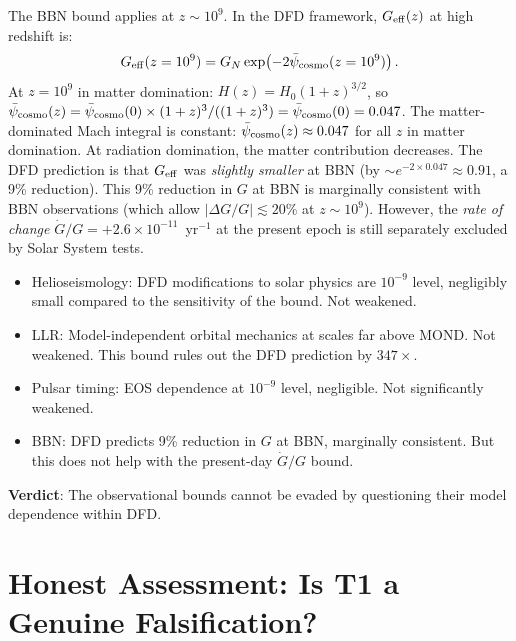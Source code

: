 \documentclass[11pt]{article}
\newcommand{\ee}[1]{\times 10^{#1}}
\newcommand{\psicosmo}{\bar{\psi}_{\rm cosmo}}
\begin{document}
The BBN bound applies at $z \sim 10^9$. In the DFD framework, $G_{\rm eff}(z)$
at high redshift is:
\begin{equation}
G_{\rm eff}(z = 10^9) = G_N\exp\!\left(-2\psicosmo(z=10^9)\right).
\end{equation}
At $z = 10^9$ in matter domination: $H(z) = H_0(1+z)^{3/2}$, so
$\psicosmo(z) = \psicosmo(0)\times(1+z)^3/((1+z)^3) = \psicosmo(0) = 0.047$.
The matter-dominated Mach integral is constant: $\psicosmo(z) \approx 0.047$
for all $z$ in matter domination. At radiation domination, the matter
contribution decreases. The DFD prediction is that $G_{\rm eff}$ was
\emph{slightly smaller} at BBN (by $\sim e^{-2\times 0.047} \approx 0.91$,
a 9\% reduction). This 9\% reduction in $G$ at BBN is marginally consistent
with BBN observations (which allow $|\Delta G/G| \lesssim 20\%$ at $z \sim 10^9$).
However, the \emph{rate of change} $\dot{G}/G = +2.6\ee{-11}$~yr$^{-1}$ at
the present epoch is still separately excluded by Solar System tests.

\begin{tcolorbox}[colback=orange!5!white, colframe=orange!60!black,
  title=\textbf{Resolution 3 Assessment: Bounds Are Not Significantly Model-Dependent}]
\begin{itemize}[nosep]
\item Helioseismology: DFD modifications to solar physics are $10^{-9}$
  level, negligibly small compared to the sensitivity of the bound. Not weakened.
\item LLR: Model-independent orbital mechanics at scales far above MOND.
  Not weakened. This bound rules out the DFD prediction by $347\times$.
\item Pulsar timing: EOS dependence at $10^{-9}$ level, negligible.
  Not significantly weakened.
\item BBN: DFD predicts 9\% reduction in $G$ at BBN, marginally consistent.
  But this does not help with the present-day $\dot{G}/G$ bound.
\end{itemize}
\textbf{Verdict}: The observational bounds cannot be evaded by questioning
their model dependence within DFD.
\end{tcolorbox}

\section{Honest Assessment: Is T1 a Genuine Falsification?}
\label{sec:falsification}
\end{document}
